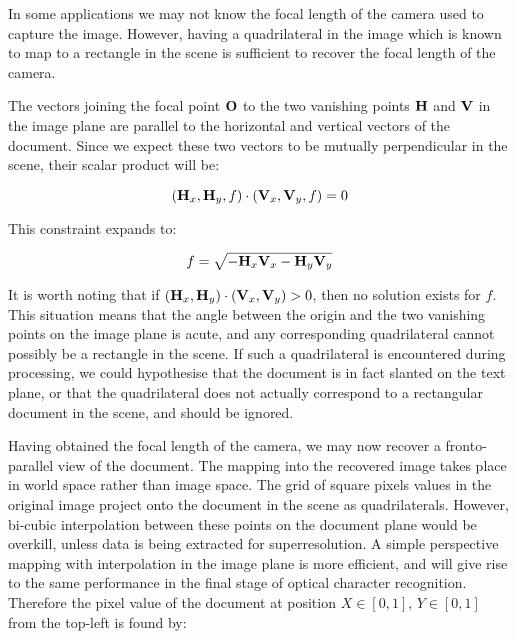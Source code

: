 In some applications we may not know the focal length of the camera used to capture the image.  However, having a quadrilateral in the image which is known to map to a rectangle in the scene is sufficient to recover the focal length of the camera.

The vectors joining the focal point ${ \bf O }$ to the two vanishing points
${ \bf H }$ and ${ \bf V }$ in the image plane are parallel to the horizontal
and vertical vectors of the document.  Since we expect these two vectors to be
mutually perpendicular in the scene, their scalar product will be:

\begin{equation}
( { \bf H }_x , { \bf H }_y , f ) \cdot ( { \bf V }_x , { \bf V }_y , f ) = 0
\end{equation}

This constraint expands to:

\begin{equation}
f = \sqrt{ - { \bf H }_x { \bf V }_x - { \bf H }_y { \bf V }_y }
\end{equation}


It is worth noting that if $ ( { \bf H }_x , { \bf H }_y ) \cdot ( { \bf V }_x ,
{ \bf V }_y ) > 0 $, then no solution exists for $f$.  This situation means that
the angle between the origin and the two vanishing points on the image plane is
acute, and any corresponding quadrilateral cannot possibly be a rectangle in the
scene.  If such a quadrilateral is encountered during processing, we could
hypothesise that the document is in fact slanted on the text plane, or that the
quadrilateral does not actually correspond to a rectangular document in the
scene, and should be ignored. 

Having obtained the focal length of the camera, we may now recover a fronto-parallel view of the document.  The mapping into the recovered image takes place in world space rather than image space.
The grid of square pixels values in the original image project onto the document in the scene as quadrilaterals.
However, bi-cubic interpolation between these points on the document plane would be overkill,
unless data is being extracted for superresolution.
A simple perspective mapping with interpolation in the image plane is more efficient, and
will give rise to the same performance in the final stage of optical character recognition.
Therefore the pixel value of the document at position $X \in [0,1]$, $Y \in [0,1]$ from the top-left is found by:


